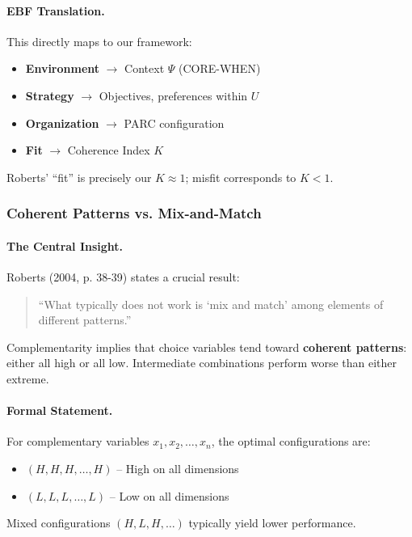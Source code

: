 \begin{center}
\end{center}

\paragraph{EBF Translation.}
This directly maps to our framework:
\begin{itemize}
    \item \textbf{Environment} $\rightarrow$ Context $\Psi$ (CORE-WHEN)
    \item \textbf{Strategy} $\rightarrow$ Objectives, preferences within $U$
    \item \textbf{Organization} $\rightarrow$ PARC configuration
    \item \textbf{Fit} $\rightarrow$ Coherence Index $K$
\end{itemize}

Roberts' ``fit'' is precisely our $K \approx 1$; misfit corresponds to $K < 1$.

\subsubsection{Coherent Patterns vs. Mix-and-Match}

\paragraph{The Central Insight.}
Roberts (2004, p. 38-39) states a crucial result:
\begin{quote}
``What typically does not work is `mix and match' among elements of different patterns.''
\end{quote}

Complementarity implies that choice variables tend toward \textbf{coherent patterns}:
either all high or all low. Intermediate combinations perform worse than either extreme.

\paragraph{Formal Statement.}
For complementary variables $x_1, x_2, \ldots, x_n$, the optimal configurations are:
\begin{itemize}
    \item $(H, H, H, \ldots, H)$ -- High on all dimensions
    \item $(L, L, L, \ldots, L)$ -- Low on all dimensions
\end{itemize}
Mixed configurations $(H, L, H, \ldots)$ typically yield lower performance.

